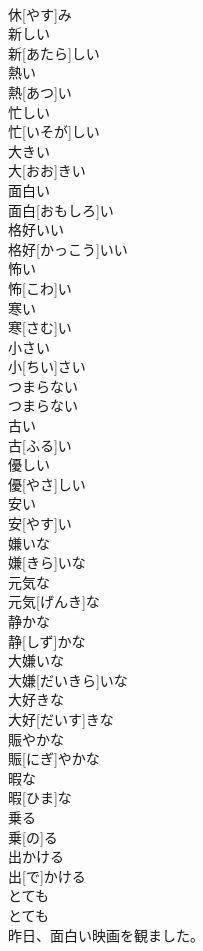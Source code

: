 \documentclass[8pt]{extreport}
\begin{document}
\begin{CJK}{UTF8}{min}
\\	休[やす]み		
\\	新しい	
\\	新[あたら]しい		
\\	熱い	
\\	熱[あつ]い		
\\	忙しい	
\\	忙[いそが]しい		
\\	大きい	
\\	大[おお]きい		
\\	面白い	
\\	面白[おもしろ]い		
\\	格好いい	
\\	格好[かっこう]いい		
\\	怖い	
\\	怖[こわ]い		
\\	寒い	
\\	寒[さむ]い		
\\	小さい	
\\	小[ちい]さい		
\\	つまらない	
\\	つまらない		
\\	古い	
\\	古[ふる]い		
\\	優しい	
\\	優[やさ]しい		
\\	安い	
\\	安[やす]い		
\\	嫌いな	
\\	嫌[きら]いな		
\\	元気な	
\\	元気[げんき]な		
\\	静かな	
\\	静[しず]かな		
\\	大嫌いな	
\\	大嫌[だいきら]いな		
\\	大好きな	
\\	大好[だいす]きな		
\\	賑やかな	
\\	賑[にぎ]やかな		
\\	暇な	
\\	暇[ひま]な		
\\	乗る	
\\	乗[の]る		
\\	出かける	
\\	出[で]かける		
\\	とても	
\\	とても		
\\	昨日、面白い映画を観ました。	

\end{CJK}
\end{document}
